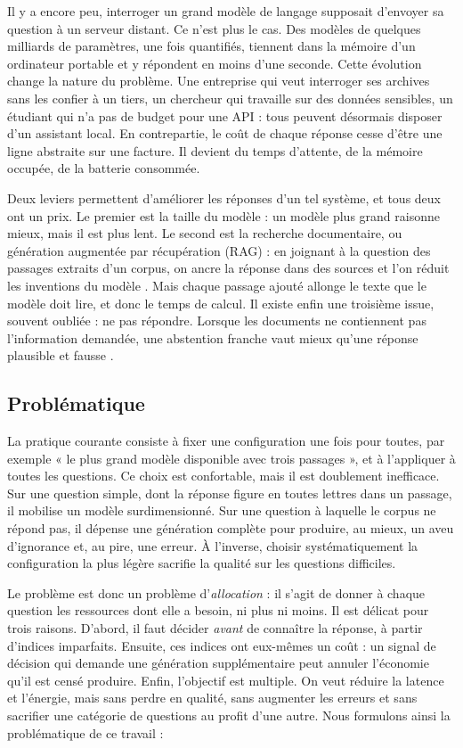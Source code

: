 \documentclass[11pt,a4paper]{article}
\begin{document}
Il y a encore peu, interroger un grand modèle de langage supposait d'envoyer sa question à un serveur
distant. Ce n'est plus le cas. Des modèles de quelques milliards de paramètres, une fois quantifiés,
tiennent dans la mémoire d'un ordinateur portable et y répondent en moins d'une seconde. Cette
évolution change la nature du problème. Une entreprise qui veut interroger ses archives sans les
confier à un tiers, un chercheur qui travaille sur des données sensibles, un étudiant qui n'a pas de
budget pour une API : tous peuvent désormais disposer d'un assistant local. En contrepartie, le coût de
chaque réponse cesse d'être une ligne abstraite sur une facture. Il devient du temps d'attente, de la
mémoire occupée, de la batterie consommée.

Deux leviers permettent d'améliorer les réponses d'un tel système, et tous deux ont un prix. Le premier
est la taille du modèle : un modèle plus grand raisonne mieux, mais il est plus lent. Le second est la
recherche documentaire, ou génération augmentée par récupération (RAG) : en joignant à la question des
passages extraits d'un corpus, on ancre la réponse dans des sources et l'on réduit les inventions du
modèle \citep{gao2023ragsurvey}. Mais chaque passage ajouté allonge le texte que le modèle doit lire, et
donc le temps de calcul. Il existe enfin une troisième issue, souvent oubliée : ne pas répondre.
Lorsque les documents ne contiennent pas l'information demandée, une abstention franche vaut mieux
qu'une réponse plausible et fausse \citep{wen2024abstention}.

\subsection{Problématique}

La pratique courante consiste à fixer une configuration une fois pour toutes, par exemple « le plus
grand modèle disponible avec trois passages », et à l'appliquer à toutes les questions. Ce choix est
confortable, mais il est doublement inefficace. Sur une question simple, dont la réponse figure en
toutes lettres dans un passage, il mobilise un modèle surdimensionné. Sur une question à laquelle le
corpus ne répond pas, il dépense une génération complète pour produire, au mieux, un aveu d'ignorance
et, au pire, une erreur. À l'inverse, choisir systématiquement la configuration la plus légère sacrifie
la qualité sur les questions difficiles.

Le problème est donc un problème d'\emph{allocation} : il s'agit de donner à chaque question les
ressources dont elle a besoin, ni plus ni moins. Il est délicat pour trois raisons. D'abord, il faut
décider \emph{avant} de connaître la réponse, à partir d'indices imparfaits. Ensuite, ces indices ont
eux-mêmes un coût : un signal de décision qui demande une génération supplémentaire peut annuler
l'économie qu'il est censé produire. Enfin, l'objectif est multiple. On veut réduire la latence et
l'énergie, mais sans perdre en qualité, sans augmenter les erreurs et sans sacrifier une catégorie de
questions au profit d'une autre. Nous formulons ainsi la problématique de ce travail :
\end{document}
